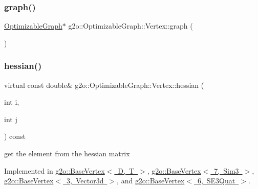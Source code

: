 \mbox{\label{classg2o_1_1_optimizable_graph_1_1_vertex_a3f845c6f0ba9a87ab15caaddba5a4037}} 
\subsubsection{\texorpdfstring{graph()}{graph()}\hspace{0.1cm}{\footnotesize\ttfamily [2/2]}}
{\footnotesize\ttfamily \mbox{\hyperlink{structg2o_1_1_optimizable_graph}{Optimizable\+Graph}}$\ast$ g2o\+::\+Optimizable\+Graph\+::\+Vertex\+::graph (\begin{DoxyParamCaption}{ }\end{DoxyParamCaption})\hspace{0.3cm}{\ttfamily [inline]}}

\mbox{\label{classg2o_1_1_optimizable_graph_1_1_vertex_af46fa4f0baa4c87e29b137f24e713acb}} 
\subsubsection{\texorpdfstring{hessian()}{hessian()}\hspace{0.1cm}{\footnotesize\ttfamily [1/2]}}
{\footnotesize\ttfamily virtual const double\& g2o\+::\+Optimizable\+Graph\+::\+Vertex\+::hessian (\begin{DoxyParamCaption}\item[{int}]{i,  }\item[{int}]{j }\end{DoxyParamCaption}) const\hspace{0.3cm}{\ttfamily [pure virtual]}}



get the element from the hessian matrix 



Implemented in \mbox{\hyperlink{classg2o_1_1_base_vertex_ac35e0c8c62a59e947ac7710ed85fcd7a}{g2o\+::\+Base\+Vertex$<$ D, T $>$}}, \mbox{\hyperlink{classg2o_1_1_base_vertex_ac35e0c8c62a59e947ac7710ed85fcd7a}{g2o\+::\+Base\+Vertex$<$ 7, Sim3 $>$}}, \mbox{\hyperlink{classg2o_1_1_base_vertex_ac35e0c8c62a59e947ac7710ed85fcd7a}{g2o\+::\+Base\+Vertex$<$ 3, Vector3d $>$}}, and \mbox{\hyperlink{classg2o_1_1_base_vertex_ac35e0c8c62a59e947ac7710ed85fcd7a}{g2o\+::\+Base\+Vertex$<$ 6, S\+E3\+Quat $>$}}.

